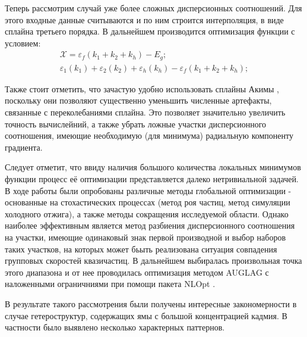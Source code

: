 \documentclass[../main.tex]{subfiles}
\begin{document}
        Теперь рассмотрим случай уже более сложных дисперсионных соотношений.
        Для этого входные данные считываются и по ним строится интерполяция,
        в виде сплайна третьего порядка. В дальнейшем производится оптимизация функции с условием:
        \begin{equation}
            \begin{array}{l}
                \mathcal{X}  = \varepsilon_f(k_1 + k_2 + k_h) - E_g;\\
                \varepsilon_1(k_1) + \varepsilon_2(k_2) + \varepsilon_h(k_h) - \varepsilon_f(k_1 + k_2 + k_h);
            \end{array}
        \end{equation}

        Также стоит отметить, что зачастую удобно использовать сплайны Акимы \cite{AkimaSplines}, поскольку они позволяют существенно уменьшить
        численные артефакты, связанные с переколебаниями сплайна. Это позволяет значительно увеличить точность вычислейний, а также убрать ложные
        участки дисперсионного соотношения, имеющие необходимую (для минимума) радиальную компоненту градиента.

        Следует отметит, что ввиду наличия большого количества локальных минимумов функции процесс её оптимизации представляется далеко нетривиальной задачей.
        В ходе работы были опробованы различные методы глобальной оптимизации - основанные на стохастических процессах (метод роя частиц, метод 
        симуляции холодного отжига), а также методы сокращения исследуемой области. Однако наиболее эффективным является метод разбиения 
        дисперсионного соотношения на участки, имеющие одинаковый знак первой производной и выбор наборов таких участков,
        на которых может бьыть реализована ситуация совпадения групповых скоростей квазичастиц. В дальнейшем выбиралась произвольная точка этого диапазона
        и от нее проводилась оптимизация методом AUGLAG \cite{AuglagOptim} с наложенными ограничниями при помощи пакета NLOpt \cite{NLopt}.

        В результате такого рассмотрения были получены интересные закономерности в случае гетероструктур, содержащих ямы с большой концентрацией кадмия.
        В частности было выявлено несколько характерных паттернов.
        
\end{document}
